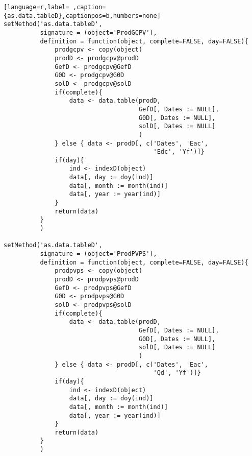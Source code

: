 \begin{lstlisting}[language=r,label= ,caption={as.data.tableD},captionpos=b,numbers=none]
setMethod('as.data.tableD',
          signature = (object='ProdGCPV'),
          definition = function(object, complete=FALSE, day=FALSE){
              prodgcpv <- copy(object)
              prodD <- prodgcpv@prodD
              GefD <- prodgcpv@GefD
              G0D <- prodgcpv@G0D
              solD <- prodgcpv@solD
              if(complete){
                  data <- data.table(prodD,
                                     GefD[, Dates := NULL],
                                     G0D[, Dates := NULL],
                                     solD[, Dates := NULL]
                                     )
              } else { data <- prodD[, c('Dates', 'Eac',
                                         'Edc', 'Yf')]}
              if(day){
                  ind <- indexD(object)
                  data[, day := doy(ind)]
                  data[, month := month(ind)]
                  data[, year := year(ind)]
              }
              return(data)
          }
          )

setMethod('as.data.tableD',
          signature = (object='ProdPVPS'),
          definition = function(object, complete=FALSE, day=FALSE){
              prodpvps <- copy(object)
              prodD <- prodpvps@prodD
              GefD <- prodpvps@GefD
              G0D <- prodpvps@G0D
              solD <- prodpvps@solD
              if(complete){
                  data <- data.table(prodD,
                                     GefD[, Dates := NULL],
                                     G0D[, Dates := NULL],
                                     solD[, Dates := NULL]
                                     )
              } else { data <- prodD[, c('Dates', 'Eac',
                                         'Qd', 'Yf')]}
              if(day){
                  ind <- indexD(object)
                  data[, day := doy(ind)]
                  data[, month := month(ind)]
                  data[, year := year(ind)]
              }
              return(data)
          }
          )
\end{lstlisting}
